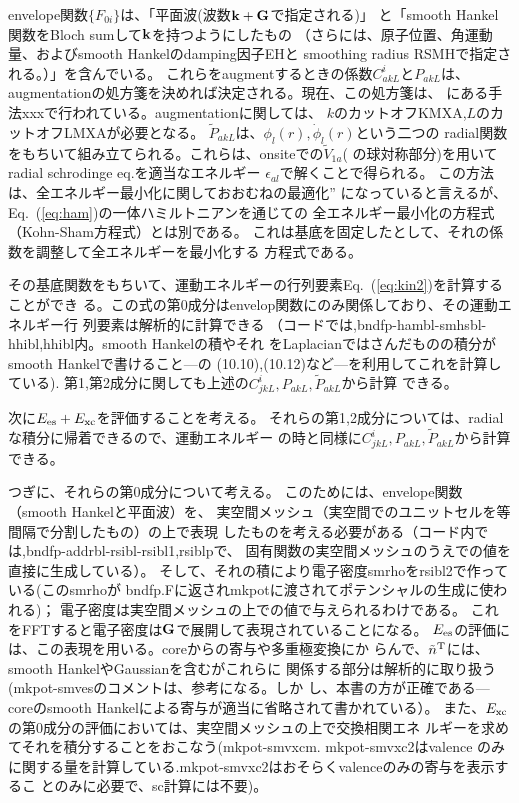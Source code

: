 \documentclass[a4paper,10pt,aip,onecolumn,amsmath,amssymb,floatfix,rmp]{revtex4-1}
\newcommand{\bfk}{{\bf k}}
\newcommand{\bfG}{{\bf G}}
\def\phidot{\dot{\phi}}
\newcommand{\req}[1]{\mbox{Eq.~\!(\ref{#1})}}
\def\tnT{\tilde{n}^{\rm T}}
\def\tV{\tilde{V}}
\def\tnT{\tilde{n}^{\rm T}}
\begin{document}
envelope関数$\{F_{0i}\}$は、「平面波(波数$\bfk+\bfG$で指定される)」
と「smooth Hankel関数をBloch sumして$\bfk$を持つようにしたもの
（さらには、原子位置、角運動量、およびsmooth Hankelのdamping因子EHと
smoothing radius RSMHで指定される。）」を含んでいる。
これらをaugmentするときの係数$C^i_{akL}$と$P_{akL}$は、
augmentationの処方箋を決めれば決定される。現在、この処方箋は、
\cite{Bott98}にある手法xxxで行われている。augmentationに関しては、
$k$のカットオフKMXA,$L$のカットオフLMXAが必要となる。
$\tilde{P}_{akL}$は、$\phi_l(r),\phidot_l(r)$という二つの
radial関数をもちいて組み立てられる。これらは、onsiteでの$\tV_{1a}$(
の球対称部分)を用いてradial schrodinge eq.を適当なエネルギー
$\epsilon_{al}$で解くことで得られる。
この方法は、全エネルギー最小化に関しておおむねの最適化''
になっていると言えるが、\req{eq:ham}の一体ハミルトニアンを通じての
全エネルギー最小化の方程式（Kohn-Sham方程式）とは別である。
これは基底を固定したとして、それの係数を調整して全エネルギーを最小化する
方程式である。

その基底関数をもちいて、運動エネルギーの行列要素\req{eq:kin2}を計算することができ
る。この式の第0成分はenvelop関数にのみ関係しており、その運動エネルギー行
列要素は解析的に計算できる
（コードでは,bndfp-hambl-smhsbl-hhibl,hhibl内。smooth Hankelの積やそれ
をLaplacianではさんだものの積分がsmooth Hankelで書けること---\cite{Bott98}の
(10.10),(10.12)など---を利用してこれを計算している).
第1,第2成分に関しても上述の$C^i_{jkL},{P}_{akL},\tilde{P}_{akL}$から計算
できる。

次に$E_{\rm es}+E_{\rm xc}$を評価することを考える。
それらの第1,2成分については、radialな積分に帰着できるので、運動エネルギー
の時と同様に$C^i_{jkL},{P}_{akL},\tilde{P}_{akL}$から計算できる。

つぎに、それらの第0成分について考える。
このためには、envelope関数（smooth Hankelと平面波）を、
実空間メッシュ（実空間でのユニットセルを等間隔で分割したもの）の上で表現
したものを考える必要がある（コード内では,bndfp-addrbl-rsibl-rsibl1,rsiblpで、
固有関数の実空間メッシュのうえでの値を直接に生成している）。
そして、それの積により電子密度smrhoをrsibl2で作っている(このsmrhoが
bndfp.Fに返されmkpotに渡されてポテンシャルの生成に使われる)；
電子密度は実空間メッシュの上での値で与えられるわけである。
これをFFTすると電子密度は$\bfG$で展開して表現されていることになる。
$E_{\rm es}$の評価には、この表現を用いる。coreからの寄与や多重極変換にか
らんで、$\tnT$には、smooth HankelやGaussianを含むがこれらに
関係する部分は解析的に取り扱う(mkpot-smvesのコメントは、参考になる。しか
し、本書の方が正確である---coreのsmooth Hankelによる寄与が適当に省略されて書かれている）。
また、$E_{\rm xc}$の第0成分の評価においては、実空間メッシュの上で交換相関エネ
ルギーを求めてそれを積分することをおこなう(mkpot-smvxcm. mkpot-smvxc2はvalence
のみに関する量を計算している.mkpot-smvxc2はおそらくvalenceのみの寄与を表示するこ
とのみに必要で、sc計算には不要)。\\
\end{document}
